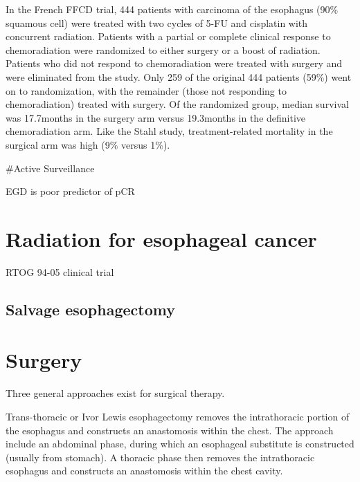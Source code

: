 \documentclass[
]{book}
\begin{document}
In the French FFCD trial, 444 patients with carcinoma of the esophagus (90\% squamous cell) were treated with two cycles of 5-FU and cisplatin with concurrent radiation.\citep{bedenne1160} Patients with a partial or complete clinical response to chemoradiation were randomized to either surgery or a boost of radiation. Patients who did not respond to chemoradiation were treated with surgery and were eliminated from the study. Only 259 of the original 444 patients (59\%) went on to randomization, with the remainder (those not responding to chemoradiation) treated with surgery. Of the randomized group, median survival was 17.7months in the surgery arm versus 19.3months in the definitive chemoradiation arm. Like the Stahl study, treatment-related mortality in the surgical arm was high (9\% versus 1\%).

\#Active Surveillance

EGD is poor predictor of pCR \citep{sarkaria764}

\hypertarget{radiation-for-esophageal-cancer}{%
\chapter{Radiation for esophageal cancer}\label{radiation-for-esophageal-cancer}}

RTOG 94-05 clinical trial \citep{minsky1167}

\hypertarget{salvage-esophagectomy}{%
\section{Salvage esophagectomy}\label{salvage-esophagectomy}}

\citep{markar922}

\citep{swisher175}

\hypertarget{surgery}{%
\chapter{Surgery}\label{surgery}}

Three general approaches exist for surgical therapy.

Trans-thoracic or Ivor Lewis esophagectomy\citep{visbal1803} removes the intrathoracic portion of the esophagus and constructs an anastomosis within the chest. The approach include an abdominal phase, during which an esophageal substitute is constructed (usually from stomach). A thoracic phase then removes the intrathoracic esophagus and constructs an anastomosis within the chest cavity.
\end{document}
